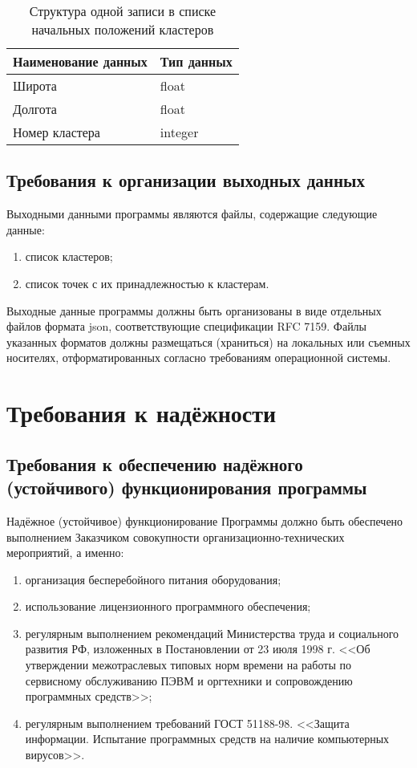 \begin{table}[ht!]
    \centering
    \caption{Структура одной записи в списке начальных положений кластеров}
    \label{table:clusters}
    \begin{tabular}{|l|l|}
        \hline
        Наименование данных & Тип данных \\ \hline
        Широта              & float      \\ \hline
        Долгота             & float      \\ \hline
        Номер кластера      & integer    \\ \hline
    \end{tabular}
\end{table}

\subsection{Требования к организации выходных данных}\label{output-files}
Выходными данными программы являются файлы, содержащие следующие данные:
\begin{enumerate}
    \item список кластеров;
    \item список точек с их принадлежностью к кластерам.
\end{enumerate}

Выходные данные программы должны быть организованы в виде отдельных файлов формата json, соответствующие спецификации RFC 7159. Файлы указанных форматов должны размещаться (храниться) на локальных или съемных носителях, 
отформатированных согласно требованиям операционной системы.

\section{Требования к надёжности}
\subsection{Требования к обеспечению надёжного (устойчивого) функционирования программы}
Надёжное (устойчивое) функционирование Программы должно быть обеспечено выполнением Заказчиком совокупности 
организационно-технических мероприятий, а именно:
\begin{enumerate}
    \item организация бесперебойного питания оборудования;
    \item использование лицензионного программного обеспечения;
    \item регулярным выполнением рекомендаций Министерства труда и социального развития РФ, изложенных в 
        Постановлении от 23 июля 1998 г. <<Об утверждении межотраслевых типовых норм времени на работы по
        сервисному обслуживанию ПЭВМ и оргтехники и сопровождению программных средств>>;
    \item регулярным выполнением требований ГОСТ 51188-98. <<Защита информации. Испытание программных средств 
        на наличие компьютерных вирусов>>.
\end{enumerate}

